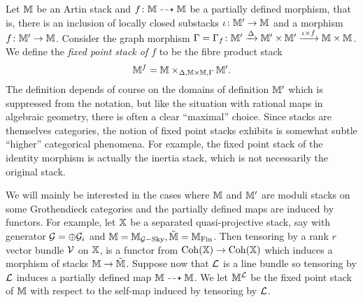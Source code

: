 \documentclass[12pt]{amsart}
\begin{document}
Let $\mathbb{M}$ be an Artin stack and $f \colon \mathbb{M} \dashrightarrow \mathbb{M}$ be a partially defined morphism, that is, there is an inclusion of locally closed substacks $\iota \colon \mathbb{M}' \to \mathbb{M}$ and a morphism $f\colon \mathbb{M}' \to \mathbb{M}$. Consider the graph morphism $\Gamma = \Gamma_{f} \colon \mathbb{M}' \xrightarrow{\Delta} \mathbb{M}' \times \mathbb{M}' \xrightarrow{\iota \times f} \mathbb{M} \times \mathbb{M}$. We define the {\em fixed point stack of $f$} to be the fibre product stack
$$ \mathbb{M}^f = \mathbb{M} \times_{\Delta,\mathbb{M} \times \mathbb{M}, \Gamma} \mathbb{M}'.$$
The definition depends of course on the domains of definition $\mathbb{M}'$ which is suppressed from the notation, but like the situation with rational maps in algebraic geometry, there is often a clear ``maximal'' choice. Since stacks are themselves categories, the notion of fixed point stacks exhibits is somewhat subtle ``higher'' categorical phenomena. For example, the fixed point stack of the identity morphism is actually the inertia stack, which is not necessarily the original stack. 



We will mainly be interested in the cases where $\mathbb{M}$ and $\mathbb{M}'$ are moduli stacks on some Grothendieck categories and the partially defined maps are induced by functors. For example, let $\mathbb{X}$ be a separated quasi-projective stack, say with generator $\mathcal{G} = \oplus \mathcal{G}_i$ and $\mathbb{M} =  \mathbb{M}_{\mathcal{G}-\textup{Sky}}, \tilde{\mathbb{M}} = \mathbb{M}_{\textup{Fin}}$. Then tensoring by a rank $r$ vector bundle $\mathcal{V}$ on $\mathbb{X}$, is a functor from $\operatorname{Coh}(\mathbb{X}) \to \operatorname{Coh}(\mathbb{X})$ which induces a morphism of stacks $\mathbb{M} \to \tilde{\mathbb{M}}$. Suppose now that $\mathcal{L}$ is a line bundle so tensoring by $\mathcal{L}$ induces a partially defined map $\mathbb{M} \dashrightarrow \mathbb{M}$. We let $\mathbb{M}^{\mathcal{L}}$ be the fixed point stack of $\mathbb{M}$ with respect to the self-map induced by tensoring by $\mathcal{L}$. 
\end{document}

